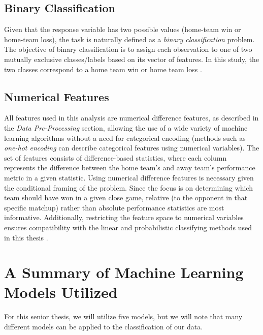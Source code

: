 \documentclass[11pt]{amsart}
\theoremstyle{definition}                  %
\theoremstyle{remark}                       %
\numberwithin{equation}{section}
\begin{document}
\subsection{Binary Classification}
Given that the response variable has two possible values (home-team win or home-team loss), the task is naturally defined as a \textit{binary classification} problem. The objective of binary classification is to assign each observation to one of two mutually exclusive classes/labels based on its vector of features. In this study, the two classes correspond to a home team win or home team loss \cite{james2021introduction}.

\subsection{Numerical Features}
All features used in this analysis are numerical difference features, as described in the \textit{Data Pre-Processing} section, allowing the use of a wide variety of machine learning algorithms without a need for categorical encoding (methods such as \textit{one-hot encoding} can describe categorical features using numerical variables). The set of features consists of difference-based statistics, where each column represents the difference between the home team’s and away team’s performance metric in a given statistic. Using numerical difference features is necessary given the conditional framing of the problem. Since the focus is on determining which team should have won in a given close game, relative (to the opponent in that specific matchup) rather than absolute performance statistics are most informative. Additionally, restricting the feature space to numerical variables ensures compatibility with the linear and probabilistic classifying methods used in this thesis \cite{hastie2009elements}.

\section{A Summary of Machine Learning Models Utilized}
For this senior thesis, we will utilize five models, but we will note that many different models can be applied to the classification of our data.
\end{document}
